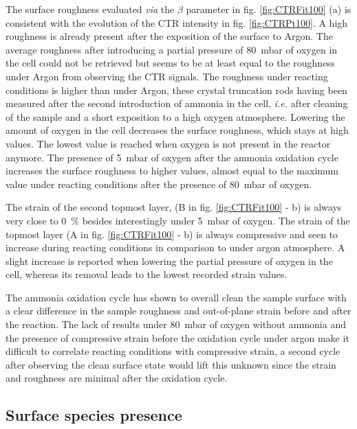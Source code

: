 The surface roughness evaluated \textit{via} the $\beta$ parameter in fig. \ref{fig:CTRFit100} (a) is consistent with the evolution of the CTR intensity in fig. \ref{fig:CTRPt100}.
A high roughness is already present after the exposition of the surface to Argon.
The average roughness after introducing a partial pressure of \qty{80}{\milli\bar} of oxygen in the cell could not be retrieved but seems to be at least equal to the roughness under Argon from observing the CTR signals.
The roughness under reacting conditions is higher than under Argon, these crystal truncation rods having been measured after the second introduction of ammonia in the cell, \textit{i.e.} after cleaning of the sample and a short exposition to a high oxygen atmosphere.
Lowering the amount of oxygen in the cell decreases the surface roughness, which stays at high values.
The lowest value is reached when oxygen is not present in the reactor anymore.
The presence of \qty{5}{\milli\bar} of oxygen after the ammonia oxidation cycle increases the surface roughness to higher values, almost equal to the maximum value under reacting conditions after the presence of \qty{80}{\milli\bar} of oxygen.

The strain of the second topmost layer, (B in fig. \ref{fig:CTRFit100} - b) is always very close to \qty{0}{\percent} besides interestingly under \qty{5}{\milli\bar} of oxygen.
The strain of the topmost layer (A in fig. \ref{fig:CTRFit100} - b) is always compressive and seen to increase during reacting conditions in comparison to under argon atmosphere.
A slight increase is reported when lowering the partial pressure of oxygen in the cell, whereas its removal leads to the lowest recorded strain values.

The ammonia oxidation cycle has shown to overall clean the sample surface with a clear difference in the sample roughness and out-of-plane strain before and after the reaction.
The lack of results under \qty{80}{\milli\bar} of oxygen without ammonia and the presence of compressive strain before the oxidation cycle under argon make it difficult to correlate reacting conditions with compressive strain, a second cycle after observing the clean surface state would lift this unknown since the strain and roughness are minimal after the oxidation cycle.

\subsection{Surface species presence}

